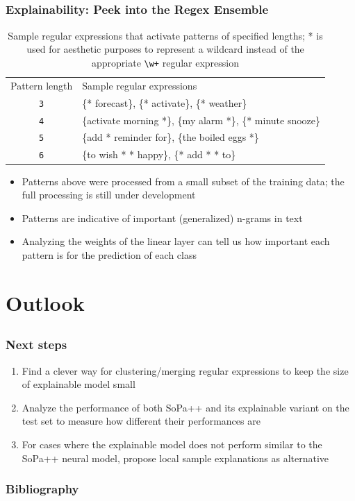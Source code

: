 \documentclass[10pt]{beamer}
\begin{document}
\subsection{}
\begin{frame}
  \frametitle{Explainability: Peek into the Regex Ensemble}
  \begin{table}[]
    \begin{tabular}{|c|l|}
      \cline{1-2}
      Pattern length & Sample regular expressions \\ \hhline{|=|=|}
      \texttt{3} & \{* forecast\}, \{* activate\}, \{* weather\} \\ \cline{1-2}
      \texttt{4} & \{activate morning *\}, \{my alarm *\}, \{* minute snooze\} \\ \cline{1-2}
      \texttt{5} & \{add * reminder for\}, \{the boiled eggs *\} \\ \cline{1-2}
      \texttt{6} & \{to wish * * happy\}, \{* add * * to\} \\ \cline{1-2}
    \end{tabular}
    \caption{Sample regular expressions that activate patterns of specified lengths; * is used for aesthetic purposes to represent a wildcard instead of the appropriate \texttt{\textbackslash{}w+} regular expression}
  \end{table}
  \begin{itemize} 
    \item Patterns above were processed from a small subset of the training data; the full processing is still under development
    \item Patterns are indicative of important (generalized) n-grams in text
    \item Analyzing the weights of the linear layer can tell us how important each pattern is for the prediction of each class
  \end{itemize} 
\end{frame} 

\section{Outlook}
\subsection{}
\begin{frame}
  \frametitle{Next steps}
  \begin{enumerate}
    [square]
    \setlength\itemsep{0.8em}
    \item Find a clever way for clustering/merging regular expressions to keep the size of explainable model small
    \item Analyze the performance of both SoPa++ and its explainable variant on the test set to measure how different their performances are
    \item For cases where the explainable model does not perform similar to the SoPa++ neural model, propose local sample explanations as alternative
  \end{enumerate}
\end{frame} 

\begin{frame}[allowframebreaks]
  \frametitle{Bibliography}
  \printbibliography[title = {Bibliography}]
\end{frame}
\end{document}
